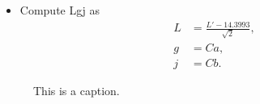 \documentclass{scrartcl}
\theoremstyle{named}
\begin{document}
\begin{itemize}
  \item Compute Lgj as
    \[
      \begin{split}
        L &= \frac{L' - 14.3993}{\sqrt{2}},\\
        g &= Ca,\\
        j &= Cb.
      \end{split}
    \]
\end{itemize}



\begin{figure}
  \centering
  \hfill
  
  \hfill
  
  \hfill
  \caption{This is a caption.}
\end{figure}

{}

\end{document}
